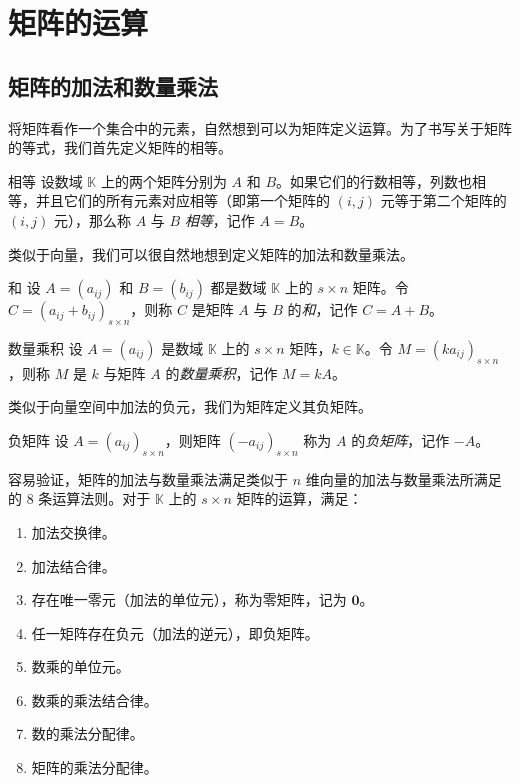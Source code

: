 
\chapter{矩阵的运算}

\section{矩阵的加法和数量乘法}

将矩阵看作一个集合中的元素，自然想到可以为矩阵定义运算。为了书写关于矩阵的等式，我们首先定义矩阵的相等。

\begin{definition}{相等}
	设数域 $\mathbb K$ 上的两个矩阵分别为 $A$ 和 $B$。如果它们的行数相等，列数也相等，并且它们的所有元素对应相等（即第一个矩阵的 $(i, j)$ 元等于第二个矩阵的 $(i, j)$ 元），那么称 $A$ 与 $B$ \emph{相等}，记作 $A = B$。
\end{definition}

类似于向量，我们可以很自然地想到定义矩阵的加法和数量乘法。

\begin{definition}{和}
	设 $A = (a_{ij})$ 和 $B = (b_{ij})$ 都是数域 $\mathbb K$ 上的 $s \times n$ 矩阵。令 $C = (a_{ij} + b_{ij})_{s \times n}$，则称 $C$ 是矩阵 $A$ 与 $B$ 的\emph{和}，记作 $C = A + B$。
\end{definition}

\begin{definition}{数量乘积}
	设 $A = (a_{ij})$ 是数域 $\mathbb K$ 上的 $s \times n$ 矩阵，$k \in \mathbb K$。令 $M = (k a_{ij})_{s \times n}$，则称 $M$ 是 $k$ 与矩阵 $A$ 的\emph{数量乘积}，记作 $M = k A$。
\end{definition}

类似于向量空间中加法的负元，我们为矩阵定义其负矩阵。

\begin{definition}{负矩阵}
	设 $A = (a_{ij})_{s \times n}$，则矩阵 $(-a_{ij})_{s \times n}$ 称为 $A$ 的\emph{负矩阵}，记作 $-A$。
\end{definition}

容易验证，矩阵的加法与数量乘法满足类似于 $n$ 维向量的加法与数量乘法所满足的 $8$ 条运算法则。对于 $\mathbb K$ 上的 $s \times n$ 矩阵的运算，满足：
\begin{enumerate}
	\item 加法交换律。
	\item 加法结合律。
	\item 存在唯一零元（加法的单位元），称为零矩阵，记为 $\mathbf 0$。
	\item 任一矩阵存在负元（加法的逆元），即负矩阵。
	\item 数乘的单位元。
	\item 数乘的乘法结合律。
	\item 数的乘法分配律。
	\item 矩阵的乘法分配律。
\end{enumerate}

